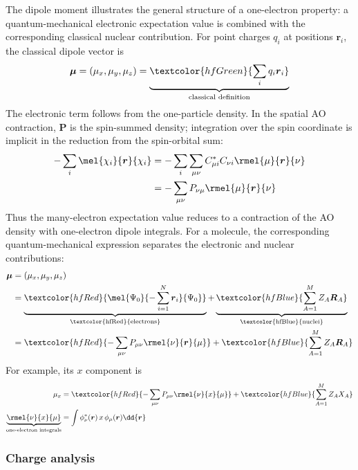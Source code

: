 \documentclass[11pt,a4paper,titlepage]{article}
\numberwithin{equation}{section}
\newcommand{\br}{\boldsymbol{r}}
\newcommand{\bP}{\boldsymbol{P}}
\newcommand{\bR}{\boldsymbol{R}}
\newcommand{\red}[1]{\textcolor{hfRed}{#1}}
\newcommand{\green}[1]{\textcolor{hfGreen}{#1}}
\newcommand{\blue}[1]{\textcolor{hfBlue}{#1}}
\begin{document}
The dipole moment illustrates the general structure of a one-electron
property: a quantum-mechanical electronic expectation value is combined with
the corresponding classical nuclear contribution.
For point charges $q_i$ at positions $\br_i$, the classical dipole vector is
\begin{equation}
  \boldsymbol{\mu}=(\mu_x,\mu_y,\mu_z)
  =\underbrace{\green{\sum_i q_i\br_i}}
    _{\text{classical definition}}
\end{equation}
The electronic term follows from the one-particle density. In the spatial
AO contraction, $\bP$ is the spin-summed density; integration over the spin
coordinate is implicit in the reduction from the spin-orbital sum:
\begin{equation}
\begin{split}
  -\sum_i\mel{\chi_i}{\br}{\chi_i}
  &=
  -\sum_i\sum_{\mu\nu}
  C_{\mu i}^*C_{\nu i}
  \rmel{\mu}{\br}{\nu}
  \\
  &=
  -\sum_{\mu\nu}P_{\nu\mu}
  \rmel{\mu}{\br}{\nu}
\end{split}
\end{equation}
Thus the many-electron expectation value reduces to a contraction of the AO
density with one-electron dipole integrals.
For a molecule, the corresponding quantum-mechanical expression separates
the electronic and nuclear contributions:
\begin{equation}
\begin{split}
  \boldsymbol{\mu}
  &=(\mu_x,\mu_y,\mu_z)
  \\
  &=\underbrace{\red{\mel{\Psi_0}{-\sum_{i=1}^{N}\br_i}{\Psi_0}}}
      _{\text{\red{electrons}}}
    +\underbrace{\blue{\sum_{A=1}^{M}Z_A\bR_A}}
      _{\text{\blue{nuclei}}}
  \\
  &=\red{-\sum_{\mu\nu}P_{\mu\nu}\rmel{\nu}{\br}{\mu}}
    +\blue{\sum_{A=1}^{M}Z_A\bR_A}
\end{split}
\end{equation}
For example, its $x$ component is
\begin{equation}
\begin{split}
  \mu_x
  &=\red{-\sum_{\mu\nu}P_{\mu\nu}\rmel{\nu}{x}{\mu}}
  +\blue{\sum_{A=1}^{M}Z_AX_A}
  \\
  \underbrace{\rmel{\nu}{x}{\mu}}_{\text{one-electron integrals}}
  &=\int\phi_\nu^*(\br)\,x\,\phi_\mu(\br)\dd{\br}
\end{split}
\end{equation}

\subsubsection{Charge analysis}
\end{document}
